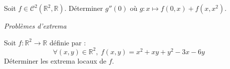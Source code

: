 \documentclass[a4paper,10pt]{report}
\begin{document}
\begin{Exa} Soit $f \in \mathcal{C}^2(\mathbb{R}^2, \mathbb{R})$. Déterminer $g''(0)$ où $g : x \mapsto f(0,x)+f(x,x^2)$.
\end{Exa}

 
 
 \medskip
 
 \begin{center}
\textit{{ {\large Problèmes d'extrema}}}
\end{center}

\begin{Exa} Soit $f : \mathbb{R}^2 \rightarrow \mathbb{R}$ définie par :
$$ \forall (x,y) \in \mathbb{R}^2, \; f(x,y) = x^{2} + xy + y^{2} - 3x - 6y$$
Déterminer les extrema locaux de $f$.
\end{Exa}
\end{document}
